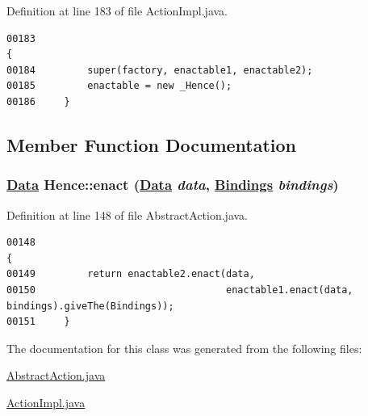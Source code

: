Definition at line 183 of file Action\-Impl.java.\footnotesize\begin{verbatim}00183                                                                                   {
00184         super(factory, enactable1, enactable2);
00185         enactable = new _Hence();
00186     }
\end{verbatim}\normalsize 


\subsection{Member Function Documentation}
\hypertarget{classHence_a1}{
\subsubsection[enact]{\setlength{\rightskip}{0pt plus 5cm}\hyperlink{interfaceData}{Data} Hence::enact (\hyperlink{interfaceData}{Data} {\em data}, \hyperlink{interfaceBindings}{Bindings} {\em bindings})}}
\label{classHence_a1}




Definition at line 148 of file Abstract\-Action.java.\footnotesize\begin{verbatim}00148                                                                                {
00149         return enactable2.enact(data, 
00150                                 enactable1.enact(data, bindings).giveThe(Bindings));
00151     }
\end{verbatim}\normalsize 


The documentation for this class was generated from the following files:\begin{CompactItemize}
\item 
\hyperlink{AbstractAction_8java-source}{Abstract\-Action.java}\item 
\hyperlink{ActionImpl_8java-source}{Action\-Impl.java}\end{CompactItemize}
